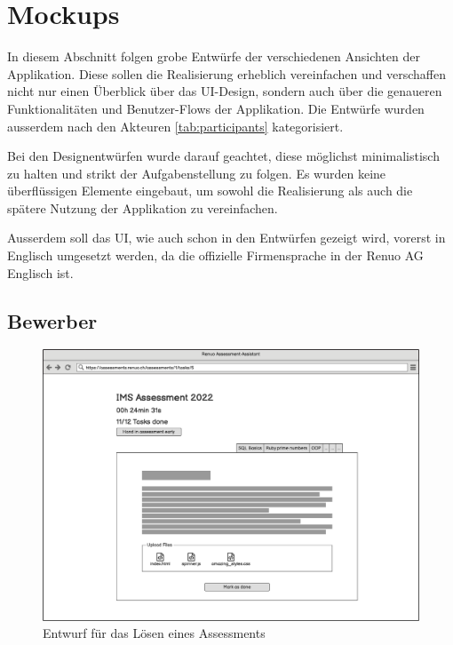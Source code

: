 \newpage

\section{Mockups}

In diesem Abschnitt folgen grobe Entwürfe der verschiedenen Ansichten der Applikation. Diese sollen die Realisierung
erheblich vereinfachen und verschaffen nicht nur einen Überblick über das UI-Design, sondern auch über die genaueren
Funktionalitäten und Benutzer-Flows der Applikation. Die Entwürfe wurden ausserdem nach den Akteuren \ref{tab:participants} kategorisiert.

Bei den Designentwürfen wurde darauf geachtet, diese möglichst minimalistisch zu halten und strikt der Aufgabenstellung zu folgen.
Es wurden keine überflüssigen Elemente eingebaut, um sowohl die Realisierung als auch die spätere Nutzung der Applikation zu vereinfachen.

Ausserdem soll das UI, wie auch schon in den Entwürfen gezeigt wird, vorerst in Englisch umgesetzt werden, da die  offizielle Firmensprache
in der Renuo AG Englisch ist.

\subsection{Bewerber}
\begin{figure}[H]
    \centering
    \includegraphics[width=12cm]{images/mockups/candidate-solve-assessment.png}
    \caption{\label{fig:mockup-candidate-solve-assessment}Entwurf für das Lösen eines Assessments}
\end{figure}

